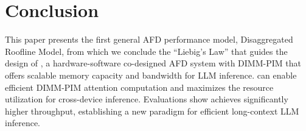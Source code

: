 \section{Conclusion}
\label{s:conclusion}

This paper 
presents
the first general AFD performance model, Disaggregated Roofline Model, from which we conclude the ``Liebig's Law'' that guides the design of \sys,
a hardware-software co-designed AFD system with DIMM-PIM that offers scalable memory capacity and bandwidth for LLM inference.
\sys can enable efficient DIMM-PIM attention computation and maximizes the resource utilization for cross-device inference.
Evaluations show \sys achieves significantly higher throughput, establishing a new paradigm for efficient long-context LLM inference.

